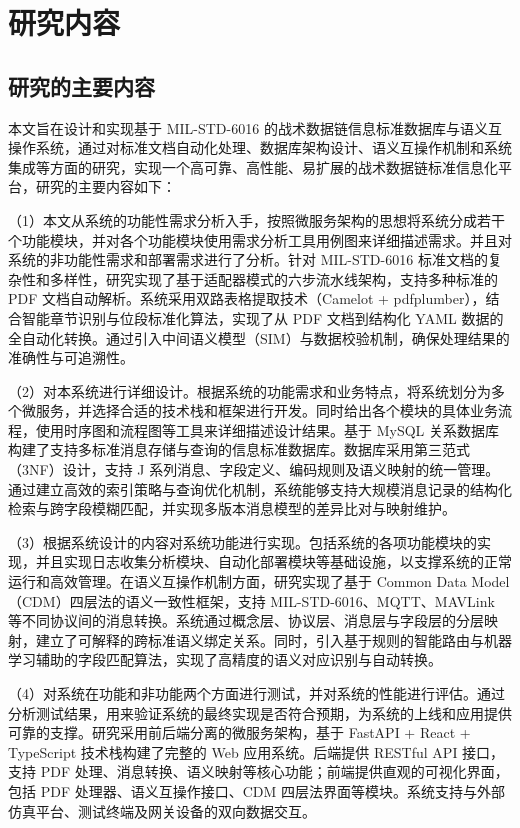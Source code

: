 \section{研究内容}

\subsection{研究的主要内容}

本文旨在设计和实现基于 MIL-STD-6016 的战术数据链信息标准数据库与语义互操作系统，通过对标准文档自动化处理、数据库架构设计、语义互操作机制和系统集成等方面的研究，实现一个高可靠、高性能、易扩展的战术数据链标准信息化平台，研究的主要内容如下：

（1）本文从系统的功能性需求分析入手，按照微服务架构的思想将系统分成若干个功能模块，并对各个功能模块使用需求分析工具用例图来详细描述需求。并且对系统的非功能性需求和部署需求进行了分析。针对 MIL-STD-6016 标准文档的复杂性和多样性，研究实现了基于适配器模式的六步流水线架构，支持多种标准的 PDF 文档自动解析\cite{MIL_STD_6016_Active_2024,MITRE_Link16_Interoperability_2024}。系统采用双路表格提取技术（Camelot + pdfplumber），结合智能章节识别与位段标准化算法，实现了从 PDF 文档到结构化 YAML 数据的全自动化转换。通过引入中间语义模型（SIM）与数据校验机制，确保处理结果的准确性与可追溯性。

（2）对本系统进行详细设计。根据系统的功能需求和业务特点，将系统划分为多个微服务，并选择合适的技术栈和框架进行开发。同时给出各个模块的具体业务流程，使用时序图和流程图等工具来详细描述设计结果。基于 MySQL 关系数据库构建了支持多标准消息存储与查询的信息标准数据库\cite{Laigner2021Data,Waseem2021Design}。数据库采用第三范式（3NF）设计，支持 J 系列消息、字段定义、编码规则及语义映射的统一管理。通过建立高效的索引策略与查询优化机制，系统能够支持大规模消息记录的结构化检索与跨字段模糊匹配，并实现多版本消息模型的差异比对与映射维护。

（3）根据系统设计的内容对系统功能进行实现。包括系统的各项功能模块的实现，并且实现日志收集分析模块、自动化部署模块等基础设施，以支撑系统的正常运行和高效管理。在语义互操作机制方面，研究实现了基于 Common Data Model（CDM）四层法的语义一致性框架，支持 MIL-STD-6016、MQTT、MAVLink 等不同协议间的消息转换\cite{Hamdan2023Reference,MITRE_Link16_Interoperability_2024}。系统通过概念层、协议层、消息层与字段层的分层映射，建立了可解释的跨标准语义绑定关系。同时，引入基于规则的智能路由与机器学习辅助的字段匹配算法，实现了高精度的语义对应识别与自动转换。

（4）对系统在功能和非功能两个方面进行测试，并对系统的性能进行评估。通过分析测试结果，用来验证系统的最终实现是否符合预期，为系统的上线和应用提供可靠的支撑。研究采用前后端分离的微服务架构，基于 FastAPI + React + TypeScript 技术栈构建了完整的 Web 应用系统\cite{Waseem2021Design,MonitoringTools2024}。后端提供 RESTful API 接口，支持 PDF 处理、消息转换、语义映射等核心功能；前端提供直观的可视化界面，包括 PDF 处理器、语义互操作接口、CDM 四层法界面等模块。系统支持与外部仿真平台、测试终端及网关设备的双向数据交互\cite{SAIC_JRE_Overview_2021,Collins_TTR_2021,L3Harris_STT_KOR24A_2020}。


